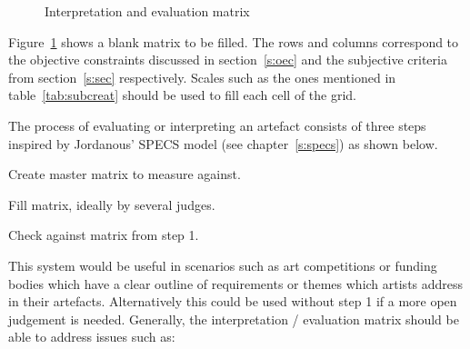 \begin{figure}[!htbp] %
  \centering
\caption[Interpretation and evaluation matrix]{Interpretation and evaluation matrix}
\label{fig:matrix}
\end{figure}

Figure~\ref{fig:matrix} shows a blank matrix to be filled. The rows and columns correspond to the objective constraints discussed in section~\ref{s:oec} and the subjective criteria from section~\ref{s:sec} respectively. Scales such as the ones mentioned in table~\ref{tab:subcreat} should be used to fill each cell of the grid. 

The process of evaluating or interpreting an artefact consists of three steps inspired by Jordanous' \ac{SPECS} model (see chapter~\ref{s:specs}) as shown below.

\begin{description}[leftmargin=2cm]
  \item[Step 1] Create master matrix to measure against.
  \item[Step 2] Fill matrix, ideally by several judges.
  \item[Step 3] Check against matrix from step 1.
\end{description}

This system would be useful in scenarios such as art competitions or funding bodies which have a clear outline of requirements or themes which artists address in their artefacts. Alternatively this could be used without step 1 if a more open judgement is needed. Generally, the interpretation / evaluation matrix should be able to address issues such as:

